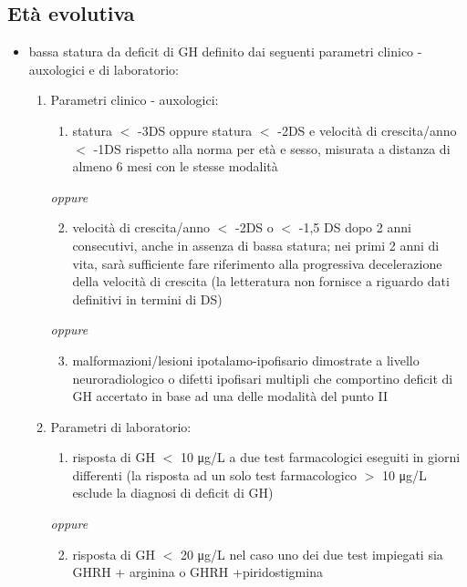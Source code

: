 \subsection*{Et\`a evolutiva}
\begin{itemize}
\item 	bassa statura da deficit di GH definito dai seguenti parametri clinico - auxologici e di laboratorio:
	\begin{enumerate}
	\renewcommand{\theenumi}{\Roman{enumi}:}
	\renewcommand{\labelenumi}{\theenumi}
	\renewcommand{\theenumii}{\alph{enumii})}
	\renewcommand{\labelenumii}{\theenumii}
	\item Parametri clinico - auxologici:
		\begin{enumerate}
			\item 	statura $<$ -3DS oppure statura $<$ -2DS e velocit\`a di crescita/anno $<$ -1DS rispetto alla norma per et\`a e
				sesso, misurata a distanza di almeno 6 mesi con le stesse modalit\`a
		\end{enumerate}
		\textit{oppure}
		\begin{enumerate}
			\setcounter{enumii}{1}
			\item 	velocit\`a di crescita/anno $<$ -2DS o $<$ -1,5 DS dopo 2 anni consecutivi, anche in assenza di bassa statura;
				nei primi 2 anni di vita, sar\`a sufficiente fare riferimento alla progressiva decelerazione della velocit\`a di
				crescita (la letteratura non fornisce a riguardo dati definitivi in termini di DS)
		\end{enumerate}
		\textit{oppure}
		\begin{enumerate}
			\setcounter{enumii}{2}
			\item 	malformazioni/lesioni ipotalamo-ipofisario dimostrate a livello neuroradiologico o difetti ipofisari
				multipli che comportino deficit di GH accertato in base ad una delle modalit\`a del punto II
		\end{enumerate}
	\item Parametri di laboratorio:
		\begin{enumerate}
			\setcounter{enumii}{0}
			\item 	risposta di GH $<$ 10 \unit{\micro g}/L a due test farmacologici eseguiti in giorni differenti (la risposta ad un solo test
				farmacologico $>$ 10 \unit{\micro g}/L esclude la diagnosi di deficit di GH) 	
		\end{enumerate}
		\textit{oppure}
		\begin{enumerate}
			\setcounter{enumii}{1}
			\item 	risposta di GH $<$ 20 \unit{\micro g}/L nel caso uno dei due test impiegati sia GHRH + arginina o GHRH
				+piridostigmina
		\end{enumerate}
	\end{enumerate}
\end{itemize}

